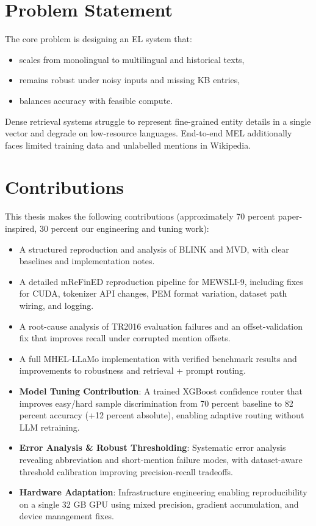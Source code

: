 \section{Problem Statement}
The core problem is designing an EL system that:
\begin{itemize}
    \item scales from monolingual to multilingual and historical texts,
    \item remains robust under noisy inputs and missing KB entries,
    \item balances accuracy with feasible compute.
\end{itemize}
Dense retrieval systems struggle to represent fine-grained entity details in a single vector and degrade on low-resource languages. End-to-end MEL additionally faces limited training data and unlabelled mentions in Wikipedia.

\section{Contributions}
This thesis makes the following contributions (approximately 70 percent paper-inspired, 30 percent our engineering and tuning work):
\begin{itemize}
    \item A structured reproduction and analysis of BLINK and MVD, with clear baselines and implementation notes.
    \item A detailed mReFinED reproduction pipeline for MEWSLI-9, including fixes for CUDA, tokenizer API changes, PEM format variation, dataset path wiring, and logging.
    \item A root-cause analysis of TR2016 evaluation failures and an offset-validation fix that improves recall under corrupted mention offsets.
    \item A full MHEL-LLaMo implementation with verified benchmark results and improvements to robustness and retrieval + prompt routing.
    \item \textbf{Model Tuning Contribution}: A trained XGBoost confidence router that improves easy/hard sample discrimination from 70 percent baseline to 82 percent accuracy (+12 percent absolute), enabling adaptive routing without LLM retraining.
    \item \textbf{Error Analysis \& Robust Thresholding}: Systematic error analysis revealing abbreviation and short-mention failure modes, with dataset-aware threshold calibration improving precision-recall tradeoffs.
    \item \textbf{Hardware Adaptation}: Infrastructure engineering enabling reproducibility on a single 32 GB GPU using mixed precision, gradient accumulation, and device management fixes.
\end{itemize}

